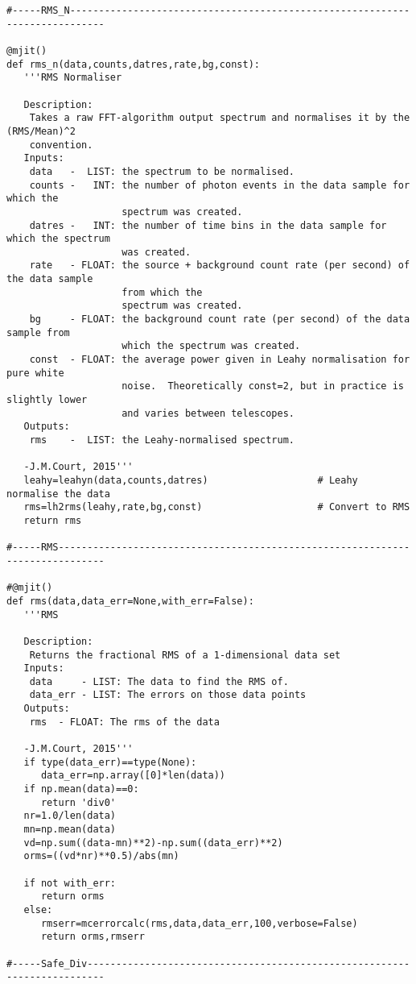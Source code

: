 \begin{verbatim}
#-----RMS_N----------------------------------------------------------------------------

@mjit()
def rms_n(data,counts,datres,rate,bg,const):
   '''RMS Normaliser

   Description:
    Takes a raw FFT-algorithm output spectrum and normalises it by the (RMS/Mean)^2
    convention.
   Inputs:
    data   -  LIST: the spectrum to be normalised.
    counts -   INT: the number of photon events in the data sample for which the
                    spectrum was created.
    datres -   INT: the number of time bins in the data sample for which the spectrum
                    was created.
    rate   - FLOAT: the source + background count rate (per second) of the data sample
                    from which the
                    spectrum was created.
    bg     - FLOAT: the background count rate (per second) of the data sample from
                    which the spectrum was created.
    const  - FLOAT: the average power given in Leahy normalisation for pure white
                    noise.  Theoretically const=2, but in practice is slightly lower
                    and varies between telescopes.
   Outputs:
    rms    -  LIST: the Leahy-normalised spectrum.

   -J.M.Court, 2015'''
   leahy=leahyn(data,counts,datres)                   # Leahy normalise the data
   rms=lh2rms(leahy,rate,bg,const)                    # Convert to RMS
   return rms

#-----RMS------------------------------------------------------------------------------

#@mjit()
def rms(data,data_err=None,with_err=False):
   '''RMS

   Description:
    Returns the fractional RMS of a 1-dimensional data set
   Inputs:
    data     - LIST: The data to find the RMS of.
    data_err - LIST: The errors on those data points
   Outputs:
    rms  - FLOAT: The rms of the data

   -J.M.Court, 2015'''
   if type(data_err)==type(None):
      data_err=np.array([0]*len(data))
   if np.mean(data)==0:
      return 'div0'
   nr=1.0/len(data)
   mn=np.mean(data)
   vd=np.sum((data-mn)**2)-np.sum((data_err)**2)
   orms=((vd*nr)**0.5)/abs(mn)

   if not with_err:
      return orms
   else:
      rmserr=mcerrorcalc(rms,data,data_err,100,verbose=False)
      return orms,rmserr

#-----Safe_Div-------------------------------------------------------------------------


\end{verbatim}
